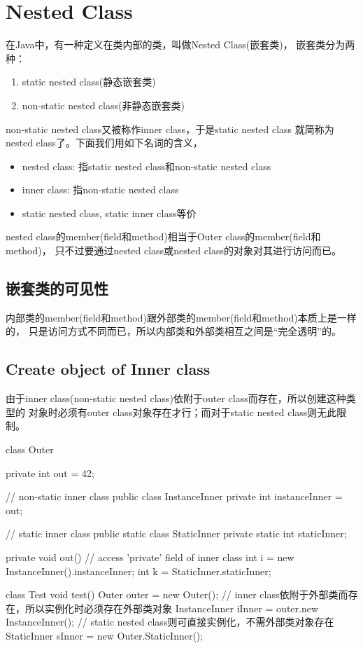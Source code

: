 \section[Nested Class]{Nested Class}
在Java中，有一种定义在类内部的类，叫做Nested Class(嵌套类)，
嵌套类分为两种：
\begin{enumerate}
  \item static nested class(静态嵌套类)
  \item non-static nested class(非静态嵌套类)
\end{enumerate}
non-static nested class又被称作inner class，于是static nested class
就简称为nested class了。下面我们用如下名词的含义，
\begin{itemize}
  \item nested class: 指static nested class和non-static nested class
  \item inner class: 指non-static nested class
  \item static nested class, static inner class等价
\end{itemize}

nested class的member(field和method)相当于Outer class的member(field和method)，
只不过要通过nested class或nested class的对象对其进行访问而已。

\subsection[嵌套类的可见性]{嵌套类的可见性}
内部类的member(field和method)跟外部类的member(field和method)本质上是一样的，
只是访问方式不同而已，所以内部类和外部类相互之间是“完全透明”的。

\subsection[Create object of Inner class ]{Create object of Inner class}
由于inner class(non-static nested class)依附于outer class而存在，所以创建这种类型的
对象时必须有outer class对象存在才行；而对于static nested class则无此限制。

\begin{javacode}
class Outer {
  private int out = 42;

  // non-static inner class
  public class InstanceInner {
    private int instanceInner = out;
  }

  // static inner class
  public static class StaticInner {
    private static int staticInner;
  }

  private void out() {
    // access 'private' field of inner class
    int i = new InstanceInner().instanceInner;
    int k = StaticInner.staticInner;
  }
}

class Test {
  void test() {
    Outer outer = new Outer();
    // inner class依附于外部类而存在，所以实例化时必须存在外部类对象
    InstanceInner iInner = outer.new InstanceInner();
    // static nested class则可直接实例化，不需外部类对象存在
    StaticInner sInner = new Outer.StaticInner();
  }
}
\end{javacode}

